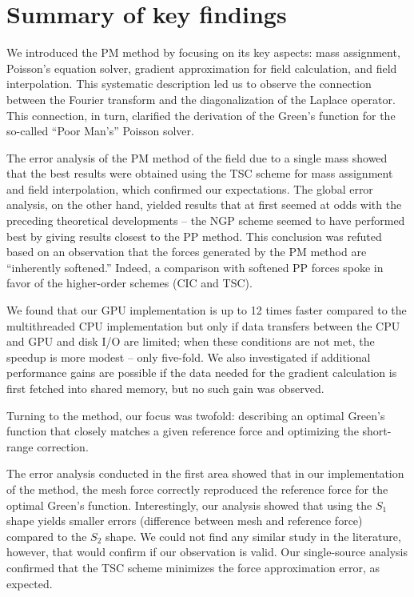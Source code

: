 \section{Summary of key findings}
We introduced the PM method by focusing on its key aspects: mass assignment, Poisson's equation solver, gradient approximation for field calculation, and field interpolation.
This systematic description led us to observe the connection between the Fourier transform and the diagonalization of the Laplace operator.
This connection, in turn, clarified the derivation of the Green's function for the so-called ``Poor Man's'' Poisson solver.

The error analysis of the PM method of the field due to a single mass showed that the best results were obtained using the TSC scheme for mass assignment and field interpolation, which confirmed our expectations.
The global error analysis, on the other hand, yielded results that at first seemed at odds with the preceding theoretical developments -- the NGP scheme seemed to have performed best by giving results closest to the PP method.
This conclusion was refuted based on an observation that the forces generated by the PM method are ``inherently softened.''
Indeed, a comparison with softened PP forces spoke in favor of the higher-order schemes (CIC and TSC).

We found that our GPU implementation is up to 12 times faster compared to the multithreaded CPU implementation but only if data transfers between the CPU and GPU and disk I/O are limited; when these conditions are not met, the speedup is more modest -- only five-fold.
We also investigated if additional performance gains are possible if the data needed for the gradient calculation is first fetched into shared memory, but no such gain was observed.

Turning to the \PThreeM{} method, our focus was twofold: describing an optimal Green's function that closely matches a given reference force and optimizing the short-range correction.

The error analysis conducted in the first area showed that in our implementation of the \PThreeM{} method, the mesh force correctly reproduced the reference force for the optimal Green's function.
Interestingly, our analysis showed that using the $S_1$ shape yields smaller errors (difference between mesh and reference force) compared to the $S_2$ shape.
We could not find any similar study in the literature, however, that would confirm if our observation is valid.
Our single-source analysis confirmed that the TSC scheme minimizes the force approximation error, as expected.

